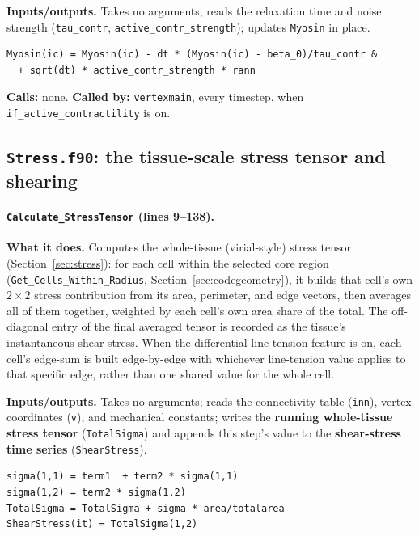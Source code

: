 \documentclass[11pt]{article}
\begin{document}
\textbf{Inputs/outputs.} Takes no arguments; reads the relaxation time and noise
strength (\texttt{tau\_contr}, \texttt{active\_contr\_strength}); updates
\texttt{Myosin} in place.

\begin{lstlisting}[caption={The noisy relaxation-to-baseline update in \texttt{Solve\_Myosin\_Act\_Contr}.}]
Myosin(ic) = Myosin(ic) - dt * (Myosin(ic) - beta_0)/tau_contr &
  + sqrt(dt) * active_contr_strength * rann
\end{lstlisting}

\textbf{Calls:} none. \textbf{Called by:} \texttt{vertexmain}, every timestep, when
\texttt{if\_active\_contractility} is on.
\subsection{\texttt{Stress.f90}: the tissue-scale stress tensor and shearing}
\label{sec:codestress}

\paragraph{\texttt{Calculate\_StressTensor} (lines 9--138).}
\textbf{What it does.} Computes the whole-tissue (virial-style) stress tensor
(Section~\ref{sec:stress}): for each cell within the selected core region
(\texttt{Get\_Cells\_Within\_Radius}, Section~\ref{sec:codegeometry}), it builds that
cell's own $2\times2$ stress contribution from its area, perimeter, and edge vectors,
then averages all of them together, weighted by each cell's own area share of the
total. The off-diagonal entry of the final averaged tensor is recorded as the
tissue's instantaneous shear stress. When the differential line-tension feature is on,
each cell's edge-sum is built edge-by-edge with whichever line-tension value applies to
that specific edge, rather than one shared value for the whole cell.

\textbf{Inputs/outputs.} Takes no arguments; reads the connectivity table
(\texttt{inn}), vertex coordinates (\texttt{v}), and mechanical constants; writes the
\textbf{running whole-tissue stress tensor} (\texttt{TotalSigma}) and appends this
step's value to the \textbf{shear-stress time series} (\texttt{ShearStress}).

\begin{lstlisting}[caption={A cell's own stress-tensor contribution and its area-weighted accumulation, in \texttt{Calculate\_StressTensor}.}]
sigma(1,1) = term1  + term2 * sigma(1,1)
sigma(1,2) = term2 * sigma(1,2)
TotalSigma = TotalSigma + sigma * area/totalarea
ShearStress(it) = TotalSigma(1,2)
\end{lstlisting}
\end{document}
